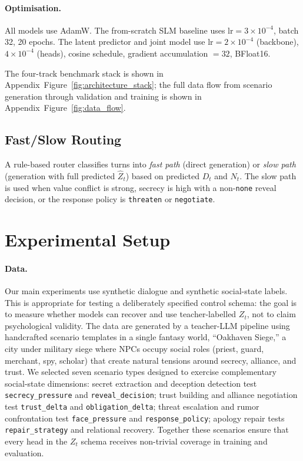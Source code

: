 \documentclass[11pt]{article}
\begin{document}
\paragraph{Optimisation.}
All models use AdamW.
The from-scratch SLM baseline uses $\text{lr}=3 \times 10^{-4}$, batch 32, 20 epochs.
The latent predictor and joint model use $\text{lr}=2 \times 10^{-4}$ (backbone), $4 \times 10^{-4}$ (heads), cosine schedule, gradient accumulation $=32$, BFloat16.

The four-track benchmark stack is shown in Appendix~Figure~\ref{fig:architecture_stack}; the full data flow from scenario generation through validation and training is shown in Appendix~Figure~\ref{fig:data_flow}.

\subsection{Fast/Slow Routing}
\label{sec:routing}

A rule-based router classifies turns into \textit{fast path} (direct generation) or \textit{slow path} (generation with full predicted $\hat{Z}_t$) based on predicted $D_t$ and $N_t$.
The slow path is used when value conflict is strong, secrecy is high with a non-\texttt{none} reveal decision, or the response policy is \texttt{threaten} or \texttt{negotiate}.

\section{Experimental Setup}
\label{sec:experiments}

\paragraph{Data.}
Our main experiments use synthetic dialogue and synthetic social-state labels.
This is appropriate for testing a deliberately specified control schema: the goal is to measure whether models can recover and use teacher-labelled $Z_t$, not to claim psychological validity.
The data are generated by a teacher-LLM pipeline using handcrafted scenario templates in a single fantasy world, ``Oakhaven Siege,'' a city under military siege where NPCs occupy social roles (priest, guard, merchant, spy, scholar) that create natural tensions around secrecy, alliance, and trust.
We selected seven scenario types designed to exercise complementary social-state dimensions: secret extraction and deception detection test \texttt{secrecy\_pressure} and \texttt{reveal\_decision}; trust building and alliance negotiation test \texttt{trust\_delta} and \texttt{obligation\_delta}; threat escalation and rumor confrontation test \texttt{face\_pressure} and \texttt{response\_policy}; apology repair tests \texttt{repair\_strategy} and relational recovery.
Together these scenarios ensure that every head in the $Z_t$ schema receives non-trivial coverage in training and evaluation.
\end{document}
